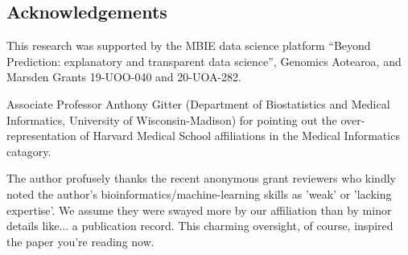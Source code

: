 \documentclass[fleqn,10pt,doc,onecolumn]{SelfArx}%
\begin{document}




\subsection*{Acknowledgements}

  This research was supported by the MBIE data
science platform ``Beyond Prediction: explanatory and transparent data
science'', Genomics Aotearoa, and Marsden
Grants 19-UOO-040 and 20-UOA-282.

Associate Professor Anthony Gitter (Department of Biostatistics and
Medical Informatics, University of Wisconsin-Madison) for pointing out
the over-representation of Harvard Medical School affiliations in the
Medical Informatics catagory.

\textcolor{rv}{The author profusely thanks the recent anonymous grant
  reviewers who kindly noted the author’s
  bioinformatics/machine-learning skills as 'weak' or 'lacking
  expertise'. We assume they were swayed more by our affiliation than
  by minor details like... a publication record. This charming
  oversight, of course, inspired the paper you're reading now.}




\end{document}
